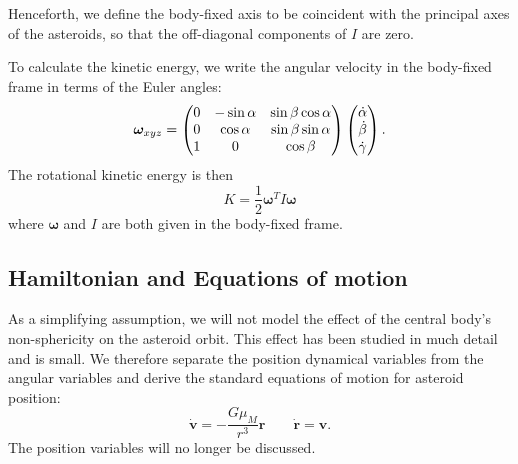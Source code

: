 \documentclass[11pt]{article}
\begin{document}
Henceforth, we define the body-fixed axis to be coincident with the principal axes of the asteroids, so that the off-diagonal components of $I$ are zero.

To calculate the kinetic energy, we write the angular velocity in the body-fixed frame in terms of the Euler angles:
\begin{equation}
\bm \omega_{xyz} = \left( \begin{matrix}
0 & -\sin \alpha & \sin \beta \cos \alpha \\
0 & \cos \alpha & \sin \beta \sin \alpha \\
1 & 0 & \cos \beta
\end{matrix} \right)
\left( \begin{matrix}
\dot \alpha\\
\dot \beta \\
\dot \gamma
\end{matrix} \right).
\label{eqn:ang-vel}
\end{equation}
The rotational kinetic energy is then
\begin{equation}
K = \frac{1}{2} \bm\omega^T I \bm \omega
\label{eqn:ke}
\end{equation}
where $\bm \omega$ and $I$ are both given in the body-fixed frame.


\subsection{Hamiltonian and Equations of motion}
As a simplifying assumption, we will not model the effect of the central body's non-sphericity on the asteroid orbit. This effect has been studied in much detail and is small. We therefore separate the position dynamical variables from the angular variables and derive the standard equations of motion for asteroid position:
\begin{equation}
\dot{\bm{v}} = -\frac{G\mu_M}{r^3}\bm{r}\qquad \dot{\bm{r}} = \bm{v}.
\label{eqn:translaton-eom}
\end{equation}
The position variables will no longer be discussed.
\end{document}
